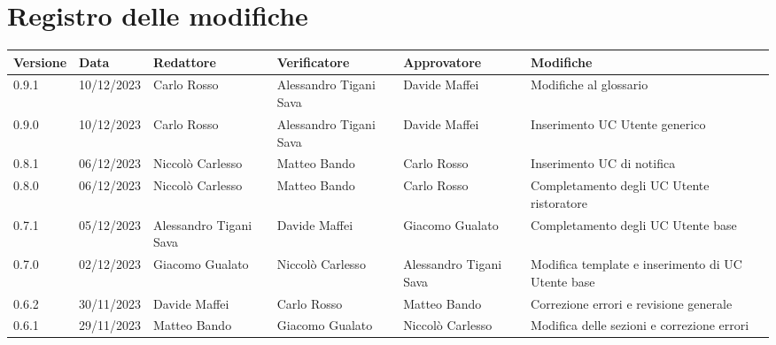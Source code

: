 \section*{Registro delle modifiche}


\begin{table}[H]
	\centering
	\fontsize{10}{12}\selectfont
	\begin{tabularx}{\textwidth}{X|X|X|X|X|X}
		\textbf{Versione}     & \textbf{Data}        & \textbf{Redattore}     &
		\textbf{Verificatore} & \textbf{Approvatore} & \textbf{Modifiche}                                                                                                                    \\
		\toprule
		0.9.1                 & 10/12/2023           & Carlo Rosso            & Alessandro Tigani Sava & Davide Maffei          & Modifiche al glossario                                     \\
		\hline
		0.9.0                 & 10/12/2023           & Carlo Rosso            & Alessandro Tigani Sava & Davide Maffei          & Inserimento UC Utente generico                             \\
		\hline
		0.8.1                 & 06/12/2023           & Niccolò Carlesso       & Matteo Bando           & Carlo Rosso            & Inserimento UC di notifica                                 \\
		\hline
		0.8.0                 & 06/12/2023           & Niccolò Carlesso       & Matteo Bando           & Carlo Rosso            & Completamento degli UC Utente ristoratore                  \\
		\hline
		0.7.1                 & 05/12/2023           & Alessandro Tigani Sava & Davide Maffei          & Giacomo Gualato        & Completamento degli UC Utente base                         \\
		\hline
		0.7.0                 & 02/12/2023           & Giacomo Gualato        & Niccolò Carlesso       & Alessandro Tigani Sava & Modifica template e inserimento di UC Utente base          \\
		\hline
		0.6.2                 & 30/11/2023           & Davide Maffei          & Carlo Rosso            & Matteo Bando           & Correzione errori e revisione generale                     \\
		\hline
		0.6.1                 & 29/11/2023           & Matteo Bando           & Giacomo Gualato        & Niccolò Carlesso       & Modifica delle sezioni e correzione errori                 \\

\end{tabularx}
\end{table}
